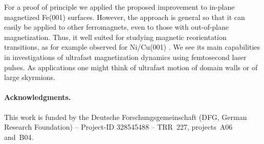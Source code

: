 \documentclass[prl,twocolumn,floatfix]{revtex4-2}
\begin{document}
For a proof of principle we applied the proposed improvement to in-plane magnetized Fe(001) surfaces. However, the approach is general so that it can easily be applied to other ferromagnets, even to those with out-of-plane magnetization. Thus, it well suited for studying magnetic reorientation transitions, as for example observed for Ni/Cu(001) . We see its main capabilities in investigations of ultrafast magnetization dynamics using femtosecond laser pulses. As applications one might think of ultrafast motion of domain walls  or of large skyrmions.

\paragraph{Acknowledgments.} This work is funded by the Deutsche Forschungsgemeinschaft (DFG, German Research Foundation) -- Project-ID 328545488 -- TRR~227, projects~A06 and~B04.

% 


\listoftodos
\end{document}
